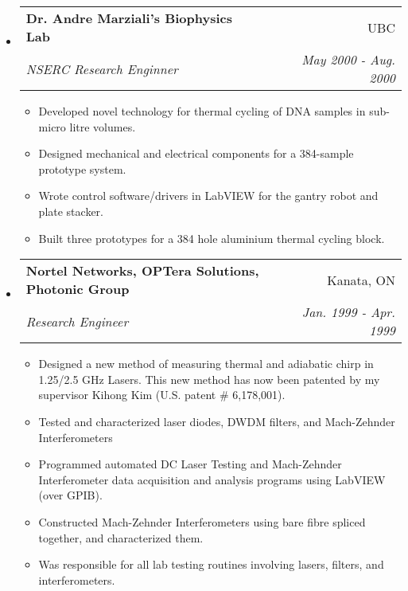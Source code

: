 \documentclass[letterpaper,11pt]{article}
\makeatletter
\newcommand{\resitem}[1]{\item #1 \vspace{-2pt}}
\newcommand{\ressubheading}[4]{
\begin{tabular*}{6.5in}{l@{\extracolsep{\fill}}r}
		\textbf{#1} & #2 \\
		\textit{#3} & \textit{#4} \\
\end{tabular*}\vspace{-6pt}}
\makeatother
\begin{document}
\begin{itemize}
\item
	\ressubheading{Dr. Andre Marziali's Biophysics Lab}{UBC}{NSERC Research Enginner}{May 2000 - Aug. 2000}
	\begin{itemize}
		\resitem{Developed novel technology for thermal cycling of DNA samples in sub-micro litre volumes.}
		\resitem{Designed mechanical and electrical components for a 384-sample prototype system.}
		\resitem{Wrote control software/drivers in LabVIEW for the gantry robot and plate stacker.}
		\resitem{Built three prototypes for a 384 hole aluminium thermal cycling block.}
	\end{itemize}

\item
	\ressubheading{Nortel Networks, OPTera Solutions, Photonic Group}{Kanata, ON}{Research Engineer}{Jan. 1999 - Apr. 1999}
	\begin{itemize}
		\resitem{Designed a new method of measuring thermal and adiabatic chirp in 1.25/2.5 GHz Lasers.  This new method has now been patented by my supervisor Kihong Kim (U.S. patent \# 6,178,001).}
		\resitem{Tested and characterized laser diodes, DWDM filters, and Mach-Zehnder Interferometers}
		\resitem{Programmed automated DC Laser Testing and Mach-Zehnder Interferometer data acquisition and analysis programs using LabVIEW (over GPIB).}
		\resitem{Constructed Mach-Zehnder Interferometers using bare fibre spliced together, and characterized them.}
		\resitem{Was responsible for all lab testing routines involving lasers, filters, and interferometers.}
	\end{itemize}
\end{itemize}
\end{document}

